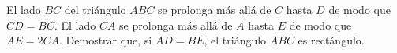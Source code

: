 El lado $BC$ del triángulo $ABC$ se prolonga más allá de $C$ hasta $D$ de modo que $CD = BC$. El lado $CA$ se prolonga más allá de $A$ hasta $E$ de modo que $AE = 2CA$. Demostrar que, si $AD=BE$, el triángulo $ABC$ es rectángulo.